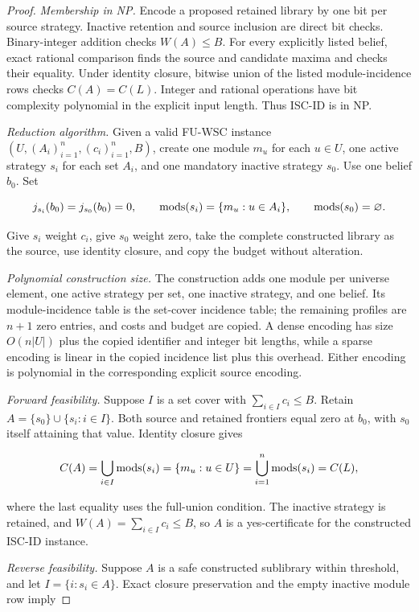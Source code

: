 \begin{proof}
\emph{Membership in NP.}
Encode a proposed retained library by one bit per source strategy. Inactive
retention and source inclusion are direct bit checks. Binary-integer addition
checks $W(A)\leq B$. For every explicitly listed belief, exact rational
comparison finds the source and candidate maxima and checks their equality.
Under identity closure, bitwise union of the listed module-incidence rows
checks $C(A)=C(L)$. Integer and rational operations have bit complexity
polynomial in the explicit input length. Thus \textsc{ISC-ID} is in NP.

\emph{Reduction algorithm.}
Given a valid \textsc{FU-WSC} instance
$(U,(A_i)_{i=1}^n,(c_i)_{i=1}^n,B)$, create one module $m_u$ for each
$u\in U$, one active strategy $s_i$ for each set $A_i$, and one mandatory
inactive strategy $s_0$. Use one belief $b_0$. Set

\[
  j_{s_i}(b_0)=j_{s_0}(b_0)=0,
  \qquad
  \operatorname{mods}(s_i)=\{m_u:u\in A_i\},
  \qquad
  \operatorname{mods}(s_0)=\varnothing.
\]

Give $s_i$ weight $c_i$, give $s_0$ weight zero, take the complete constructed
library as the source, use identity closure, and copy the budget without
alteration.

\emph{Polynomial construction size.}
The construction adds one module per universe element, one active strategy per
set, one inactive strategy, and one belief. Its module-incidence table is the
set-cover incidence table; the remaining profiles are $n+1$ zero entries, and
costs and budget are copied. A dense encoding has size $O(n|U|)$ plus the
copied identifier and integer bit lengths, while a sparse encoding is linear
in the copied incidence list plus this overhead. Either encoding is polynomial
in the corresponding explicit source encoding.

\emph{Forward feasibility.}
Suppose $I$ is a set cover with $\sum_{i\in I}c_i\leq B$. Retain
$A=\{s_0\}\cup\{s_i:i\in I\}$. Both source and retained frontiers equal zero
at $b_0$, with $s_0$ itself attaining that value. Identity closure gives

\[
 C(A)=\bigcup_{i\in I}\operatorname{mods}(s_i)
     =\{m_u:u\in U\}
     =\bigcup_{i=1}^n\operatorname{mods}(s_i)=C(L),
\]

where the last equality uses the full-union condition. The inactive strategy
is retained, and $W(A)=\sum_{i\in I}c_i\leq B$, so $A$ is a yes-certificate
for the constructed \textsc{ISC-ID} instance.

\emph{Reverse feasibility.}
Suppose $A$ is a safe constructed sublibrary within threshold, and let
$I=\{i:s_i\in A\}$. Exact closure preservation and the empty inactive module
row imply


\end{proof}
